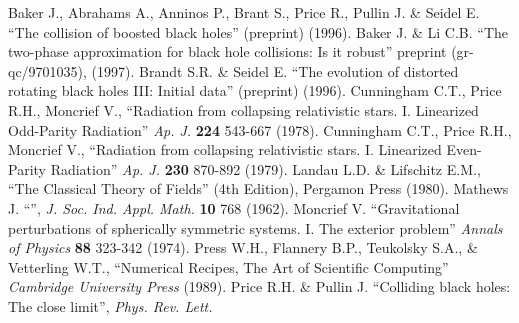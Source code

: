 \begin{thebibliography}{9}
       Baker J., Abrahams A., Anninos P., Brant S., 
                          Price R., Pullin J. \& Seidel E. 
                        ``The collision of boosted black holes'' 
                        (preprint) 
                        (1996).
       Baker J. \& Li C.B.
                        ``The two-phase approximation for black hole 
                          collisions: Is it robust''
                        preprint (gr-qc/9701035),
                        (1997).
      Brandt S.R. \& Seidel E. 
                        ``The evolution of distorted rotating black holes III:
                          Initial data'' 
                        (preprint) 
                        (1996).
  Cunningham C.T., Price R.H., Moncrief V.,
                        ``Radiation from collapsing 
                          relativistic stars. 
                          I. Linearized Odd-Parity Radiation''
                        {\em Ap. J.}
                        {\bf 224}
                        543-667
                        (1978).
  Cunningham C.T., Price R.H., Moncrief V.,
                        ``Radiation from collapsing 
                          relativistic stars. 
                          I. Linearized Even-Parity Radiation''
                        {\em Ap. J.}
                        {\bf 230}
                        870-892
                        (1979).
      Landau L.D. \& Lifschitz E.M.,
                        ``The Classical Theory of Fields''
                        (4th Edition),
                        Pergamon Press
                        (1980).
       Mathews J. ``'', 
                        {\em J. Soc. Ind. Appl. Math.} 
                        {\bf 10}
                        768 
                        (1962).
    Moncrief V. ``Gravitational perturbations of spherically
                        symmetric systems. I. The exterior problem''
                        {\em Annals of Physics} 
                        {\bf 88}
                        323-342 
                        (1974).
        Press W.H., Flannery B.P., Teukolsky S.A., \& Vetterling W.T.,
                        ``Numerical Recipes, The Art of Scientific Computing''
                        {\em Cambridge University Press} 
                        (1989).
       Price R.H. \& Pullin J. 
                        ``Colliding black holes: The close limit'',
                        {\em Phys. Rev. Lett.} 

\end{thebibliography}
